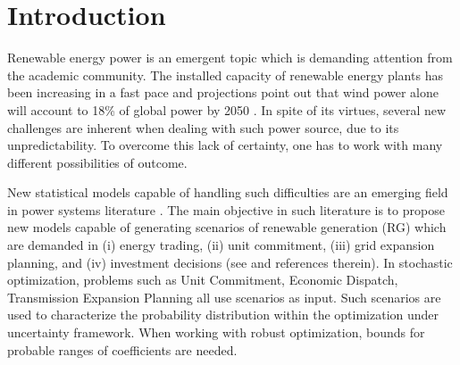 \section{Introduction}


Renewable energy power is an emergent topic which is demanding attention from the academic community. %
The installed capacity of renewable energy plants has been increasing in a fast pace and projections point out that wind power alone will account to 18\% of global power by 2050  \cite{IntEnerAgency}.
In spite of its virtues, several new challenges are inherent when dealing with such power source, due to its unpredictability. To overcome this lack of certainty, one has to work with many different possibilities of outcome.

New statistical models capable of handling such difficulties are an emerging field in power systems literature \cite{zhang_review_2014 , bessa2012time, gallego2016line,moller_time-adaptive_2008,nielsen2006,bremnes_probabilistic_2004,wan_direct_2017}. 
The main objective in such literature is to propose new models capable of generating scenarios of renewable generation (RG) which are demanded in (i) energy trading, (ii) unit commitment, (iii) grid expansion planning, and (iv) investment decisions (see \cite{moreiraStreet,jabr2013robust,zhaoguan,Aderson2017} and references therein). 
In stochastic optimization, problems such as Unit Commitment, Economic Dispatch, Transmission Expansion Planning all use scenarios as input. 
Such scenarios are used to characterize the probability distribution within the optimization under uncertainty framework.
When working with robust optimization, bounds for probable ranges of coefficients are needed.

 
